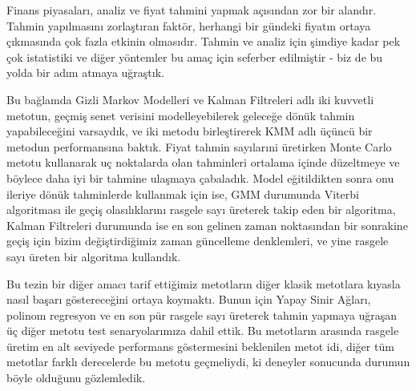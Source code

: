 \begin{ozet}
Finans piyasaları, analiz ve fiyat tahmini yapmak açısından zor bir
alandır. Tahmin yapılmasını zorlaştıran faktör, herhangi bir gündeki fiyatın
ortaya çıkmasında çok fazla etkinin olmasıdır. Tahmin ve analiz için şimdiye
kadar pek çok istatistiki ve diğer yöntemler bu amaç için seferber edilmiştir -
biz de bu yolda bir adım atmaya uğraştık.

Bu bağlamda Gizli Markov Modelleri ve Kalman Filtreleri adlı iki kuvvetli
metotun, geçmiş senet verisini modelleyebilerek geleceğe dönük tahmin
yapabileceğini varsay\-dık, ve iki metodu birleştirerek KMM adlı üçüncü bir
metodun performansına baktık. Fiyat tahmin sayılarıni üretirken Monte Carlo
metotu kullanarak uç noktalarda olan tahminleri ortalama içinde düzeltmeye ve
böylece daha iyi bir tahmine ulaşmaya çabaladık. Model eğitildikten sonra onu
ileriye dönük tahminlerde kullanmak için ise, GMM durumunda Viterbi algoritması
ile geçiş olasılıklarını rasgele sayı üreterek takip eden bir algoritma, Kalman
Filtreleri durumunda ise en son gelinen zaman noktasından bir sonrakine geçiş
için bizim değiştirdiğimiz zaman güncelleme denklemleri, ve yine rasgele sayı
üreten bir algoritma kullandık.

Bu tezin bir diğer amacı tarif ettiğimiz metotların diğer klasik metotlara
kıyasla nasıl başarı göstereceğini ortaya koymaktı. Bunun için Yapay Sinir
Ağları, polinom regresyon ve en son pür rasgele sayı üreterek tahmin yapmaya
uğraşan üç diğer metotu test senaryolarımıza dahil ettik. Bu metotların arasında
rasgele üretim en alt seviyede performans göstermesini beklenilen metot idi,
diğer tüm metotlar farklı derecelerde bu metotu geçmeliydi, ki deneyler
sonucunda durumun böyle olduğunu gözlemledik.
\end{ozet}

\tableofcontents
\listoffigures
\listoftables

